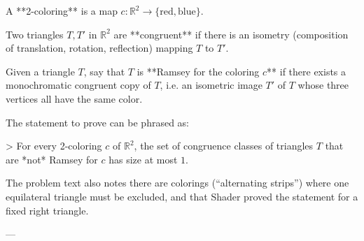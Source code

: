 A **2-coloring** is a map $c:\mathbb R^2\to\{\text{red},\text{blue}\}$.

Two triangles $T,T'$ in $\mathbb R^2$ are **congruent** if there is an isometry (composition of translation, rotation, reflection) mapping $T$ to $T'$.

Given a triangle $T$, say that $T$ is **Ramsey for the coloring $c$** if there exists a monochromatic congruent copy of $T$, i.e. an isometric image $T'$ of $T$ whose three vertices all have the same color.

The statement to prove can be phrased as:

> For every 2-coloring $c$ of $\mathbb R^2$, the set of congruence classes of triangles $T$ that are *not* Ramsey for $c$ has size at most $1$.

The problem text also notes there are colorings (“alternating strips”) where one equilateral triangle must be excluded, and that Shader proved the statement for a fixed right triangle.

---
